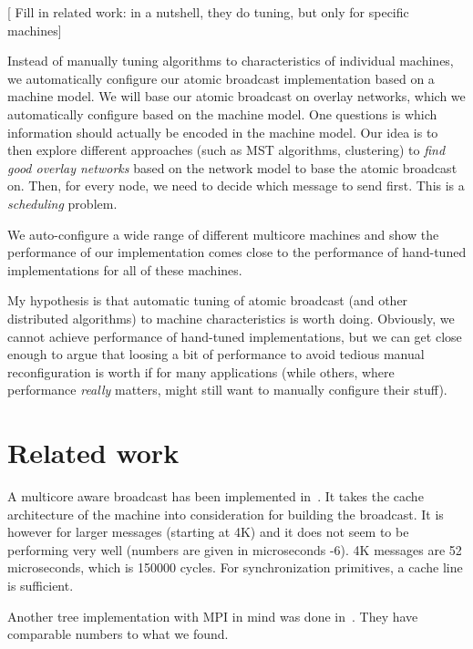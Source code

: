 \documentclass{article}
\newcommand{\stefan}[1]{
  {\color{skRed}[{\color{red}{SK}} #1]}}
\begin{document}
\stefan{Fill in related work: in a nutshell, they do tuning, but only
  for specific machines}

Instead of manually tuning algorithms to characteristics of individual
machines, we automatically configure our atomic broadcast
implementation based on a machine model.
We will base our atomic broadcast on overlay networks, which we
automatically configure based on the machine model. One questions is
which information should actually be encoded in the machine model. %
Our idea is to then explore different approaches (such as MST
algorithms, clustering) to \emph{find good overlay networks} based on
the network model to base the atomic broadcast on. Then, for every
node, we need to decide which message to send first. This is a
\emph{scheduling} problem.

We auto-configure a wide range of different multicore machines and
show the performance of our implementation comes close to the
performance of hand-tuned implementations for all of these machines.

My hypothesis is that automatic tuning of atomic broadcast (and other
distributed algorithms) to machine characteristics is worth
doing. Obviously, we cannot achieve performance of hand-tuned
implementations, but we can get close enough to argue that loosing a
bit of performance to avoid tedious manual reconfiguration is worth if
for many applications (while others, where performance \emph{really}
matters, might still want to manually configure their stuff).

\section{Related work}

A multicore aware broadcast has been implemented in~\cite{Tu2008}. It
takes the cache architecture of the machine into consideration for
building the broadcast. It is however for larger messages (starting at
4K) and it does not seem to be performing very well (numbers are given
in microseconds -6). 4K messages are 52 microseconds, which is 150000
cycles. For synchronization primitives, a cache line is sufficient.

Another tree implementation with MPI in mind was done
in~\cite{Graham2008}. They have comparable numbers to what we found. 

\end{document}
